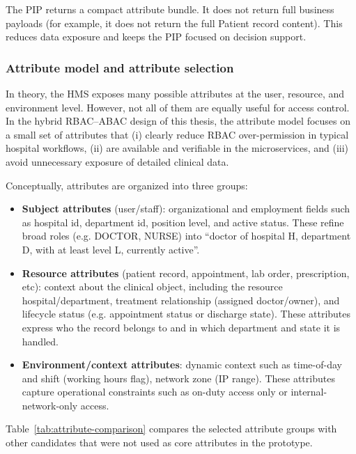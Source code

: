 The PIP returns a compact attribute bundle. It does not return full business payloads (for example, it does not return the full Patient record content). This reduces data exposure and keeps the PIP focused on decision support.

\subsubsection{Attribute model and attribute selection}
In theory, the HMS exposes many possible attributes at the user, resource, and environment level. However,
not all of them are equally useful for access control. In the hybrid RBAC--ABAC design of this thesis, the
attribute model focuses on a small set of attributes that (i) clearly reduce RBAC over-permission in typical
hospital workflows, (ii) are available and verifiable in the microservices, and (iii) avoid unnecessary
exposure of detailed clinical data.

Conceptually, attributes are organized into three groups:

\begin{itemize}
  \item \textbf{Subject attributes} (user/staff): organizational and employment fields such as
  hospital id, department id, position level, and active status. These refine broad roles (e.g. DOCTOR,
  NURSE) into ``doctor of hospital H, department D, with at least level L, currently active''.

  \item \textbf{Resource attributes} (patient record, appointment, lab order, prescription, etc): context
  about the clinical object, including the resource hospital/department, treatment relationship
  (assigned doctor/owner), and lifecycle status (e.g. appointment status or discharge state). These
  attributes express who the record belongs to and in which department and state it is handled.

  \item \textbf{Environment/context attributes}: dynamic context such as time-of-day and shift
  (working hours flag), network zone (IP range). These attributes capture
  operational constraints such as on-duty access only or internal-network-only access.
\end{itemize}

Table~\ref{tab:attribute-comparison} compares the selected attribute groups with other candidates that
were not used as core attributes in the prototype.

